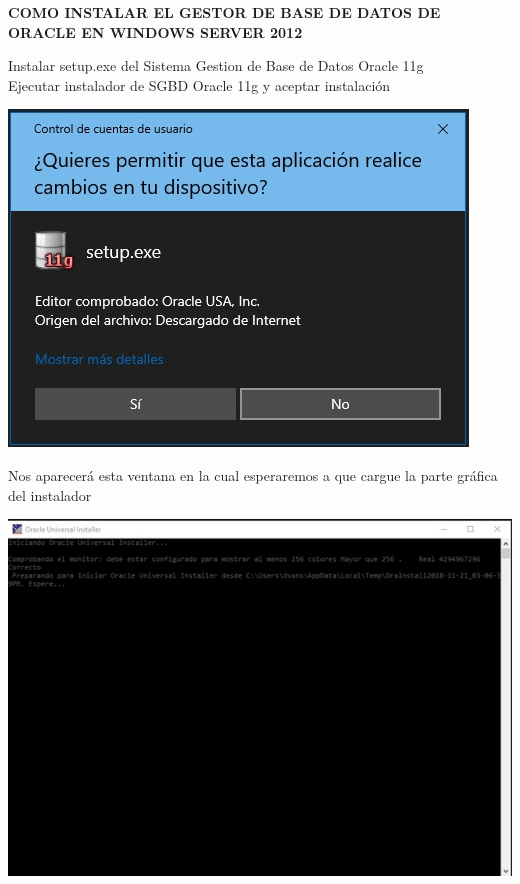 \begin{center}
\textbf{COMO INSTALAR EL GESTOR DE BASE DE DATOS DE ORACLE EN WINDOWS SERVER 2012}
\end{center}

\begin{flushleft}
Instalar setup.exe del Sistema Gestion de Base de Datos Oracle 11g\\
Ejecutar instalador de SGBD Oracle 11g y aceptar instalación
\begin{center}
\includegraphics{images/image-01}\\
\end{center}
Nos aparecerá esta ventana en la cual esperaremos a que cargue la parte gráfica del instalador\\
\begin{center}
\includegraphics{images/image-02}\\

\end{center}
\end{flushleft}

